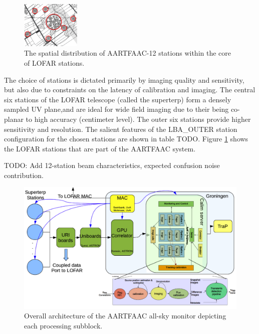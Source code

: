 \documentclass{aa}
\begin{document}
\begin{figure}[htbp]
\centering
\includegraphics[width=0.25\textwidth]{Figs/afaac12_arrayconfig.png}
\caption{The spatial distribution of AARTFAAC-12 stations within the core of LOFAR stations.}
\label{fig:afaac12_arrayconfig}
\end{figure}

The choice of stations is dictated primarily by imaging quality and sensitivity,
but  also due  to constraints  on the  latency of  calibration and  imaging. The
central  six stations  of  the LOFAR  telescope (called  the  superterp) form  a
densely sampled UV plane,and are ideal for wide field imaging due to their being
co-planar to  high accuracy (centimeter  level). The outer six  stations provide
higher  sensitivity  and resolution.  The  salient  features of  the  LBA\_OUTER
station configuration  for the chosen stations  are shown in table  TODO. Figure
\ref{fig:afaac12_arrayconfig}  shows the  LOFAR stations  that are  part of  the
AARTFAAC system.

TODO: Add 12-station beam characteristics, expected confusion noise contribution.

\begin{figure}[htbp]
\centering
\includegraphics[width=1\textwidth]{Figs/overall_afaac_Arch_blks.png}
\caption{Overall architecture of the AARTFAAC all-sky monitor depicting each processing subblock.}
\label{fig:afaac_arch}
\end{figure}
\end{document}
